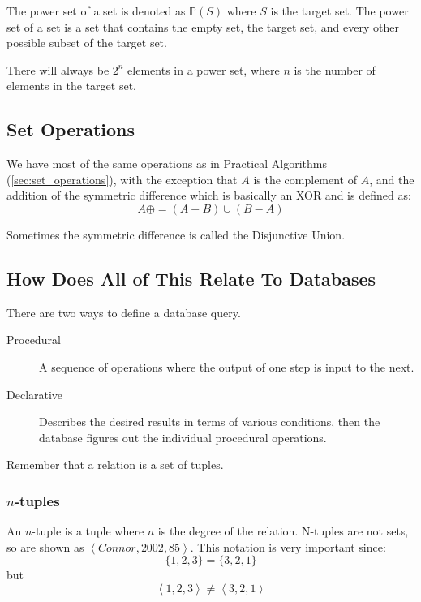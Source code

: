The power set of a set is denoted as \(\mathbb{P}(S)\) where \(S\) is the target set.
The power set of a set is a set that contains the empty set, the target set, and every other possible subset of the target set.

\begin{note}
    There will always be \(2^{n}\) elements in a power set, where \(n\) is the number of elements in the target set.
\end{note}

\subsection{Set Operations}\label{sub:set_opeationsdsrsix}

We have most of the same operations as in Practical Algorithms (\cref{sec:set_operations}), with the exception that \(\overline{A}\) is the complement of \(A\), and the addition of the symmetric difference which is basically an XOR and is defined as:
\[
    A \oplus = (A-B) \cup (B-A)
\]
\begin{note}
    Sometimes the symmetric difference is called the Disjunctive Union.
\end{note}

\subsection{How Does All of This Relate To Databases}\label{sub:how_does_all_of_this_relate_to_databases}

There are two ways to define a database query.
\begin{description}
    \item[Procedural] A sequence of operations where the output of one step is input to the next.
    \item[Declarative] Describes the desired results in terms of various conditions, then the database figures out the individual procedural operations.
\end{description}
\begin{note}
    Remember that a relation is a set of tuples.
\end{note}

\subsubsection{\(n\)-tuples}\label{ssub:n_tuples}

An \(n\)-tuple is a tuple where \(n\) is the degree of the relation.
N-tuples are not sets, so are shown as \(\left<Connor, 2002, 85\right>\).
This notation is very important since:
\[
    \{1, 2, 3\} = \{3, 2, 1\}
\]
but
\[
    \left<1, 2, 3\right> \neq \left<3, 2, 1 \right>
\]

